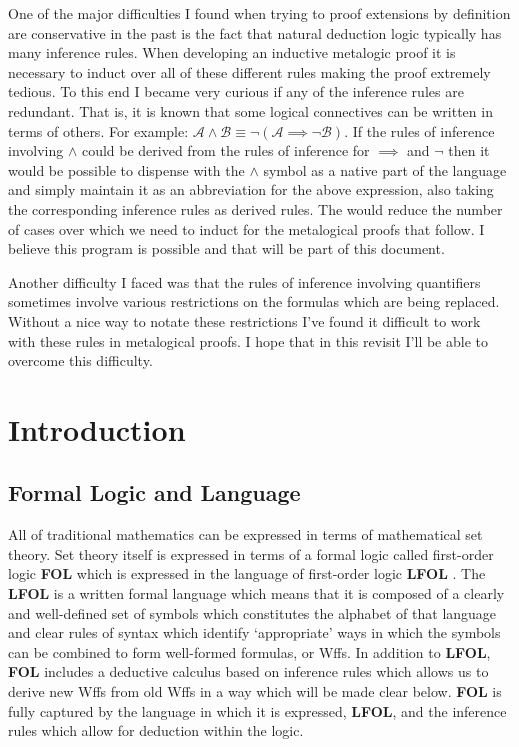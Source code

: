 \documentclass[12pt]{article}
\newcommand{\mc}[1]{\mathcal{#1}}
\begin{document}
One of the major difficulties I found when trying to proof extensions by definition are conservative in the past is the fact that natural deduction logic typically has many inference rules.
When developing an inductive metalogic proof it is necessary to induct over all of these different rules making the proof extremely tedious.
To this end I became very curious if any of the inference rules are redundant.
That is, it is known that some logical connectives can be written in terms of others.
For example: $\mc{A}\land\mc{B} \equiv \lnot(\mc{A}\implies \lnot\mc{B})$.
If the rules of inference involving $\land$ could be derived from the rules of inference for $\implies$ and $\lnot$ then it would be possible to dispense with the $\land$ symbol as a native part of the language and simply maintain it as an abbreviation for the above expression, also taking the corresponding inference rules as derived rules.
The would reduce the number of cases over which we need to induct for the metalogical proofs that follow.
I believe this program is possible and that will be part of this document.

Another difficulty I faced was that the rules of inference involving quantifiers sometimes involve various restrictions on the formulas which are being replaced.
Without a nice way to notate these restrictions I've found it difficult to work with these rules in metalogical proofs.
I hope that in this revisit I'll be able to overcome this difficulty.


\newpage
\section{Introduction}

\subsection{Formal Logic and Language}
All of traditional mathematics can be expressed in terms of mathematical set theory. 
Set theory itself is expressed in terms of a formal logic called first-order logic \textbf{FOL} which is expressed in the language of first-order logic \textbf{LFOL} .
The \textbf{LFOL} is a written formal language which means that it is composed of a clearly and well-defined set of symbols which constitutes the alphabet of that language and clear rules of syntax which identify `appropriate' ways in which the symbols can be combined to form well-formed formulas, or Wffs.
In addition to \textbf{LFOL}, \textbf{FOL} includes a deductive calculus based on inference rules which allows us to derive new Wffs from old Wffs in a way which will be made clear below.
\textbf{FOL} is fully captured by the language in which it is expressed, \textbf{LFOL}, and the inference rules which allow for deduction within the logic.
\end{document}
